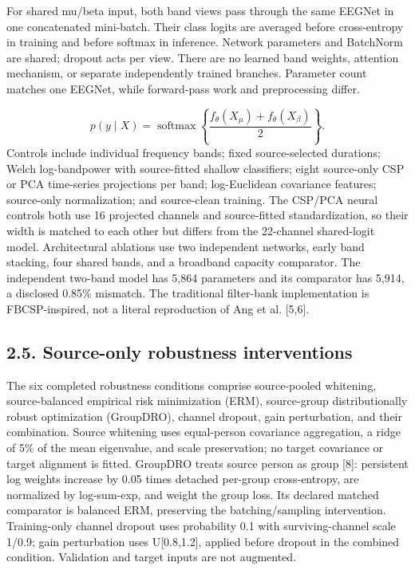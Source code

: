 \documentclass[11pt]{article}
\begin{document}
For shared mu/beta input, both band views pass through the same EEGNet in one concatenated mini-batch. Their class logits are averaged before cross-entropy in training and before softmax in inference. Network parameters and BatchNorm are shared; dropout acts per view. There are no learned band weights, attention mechanism, or separate independently trained branches. Parameter count matches one EEGNet, while forward-pass work and preprocessing differ.

\begin{equation*}
p(y\mid X)=\operatorname{softmax}\left\{\frac{f_{\theta}(X_{\mu})+f_{\theta}(X_{\beta})}{2}\right\}.
\end{equation*}
Controls include individual frequency bands; fixed source-selected durations; Welch log-bandpower with source-fitted shallow classifiers; eight source-only CSP or PCA time-series projections per band; log-Euclidean covariance features; source-only normalization; and source-clean training. The CSP/PCA neural controls both use 16 projected channels and source-fitted standardization, so their width is matched to each other but differs from the 22-channel shared-logit model. Architectural ablations use two independent networks, early band stacking, four shared bands, and a broadband capacity comparator. The independent two-band model has 5,864 parameters and its comparator has 5,914, a disclosed 0.85\% mismatch. The traditional filter-bank implementation is FBCSP-inspired, not a literal reproduction of Ang et al. [5,6].

\subsection*{2.5. Source-only robustness interventions}
The six completed robustness conditions comprise source-pooled whitening, source-balanced empirical risk minimization (ERM), source-group distributionally robust optimization (GroupDRO), channel dropout, gain perturbation, and their combination. Source whitening uses equal-person covariance aggregation, a ridge of 5\% of the mean eigenvalue, and scale preservation; no target covariance or target alignment is fitted. GroupDRO treats source person as group [8]: persistent log weights increase by 0.05 times detached per-group cross-entropy, are normalized by log-sum-exp, and weight the group loss. Its declared matched comparator is balanced ERM, preserving the batching/sampling intervention. Training-only channel dropout uses probability 0.1 with surviving-channel scale 1/0.9; gain perturbation uses U[0.8,1.2], applied before dropout in the combined condition. Validation and target inputs are not augmented.
\end{document}
